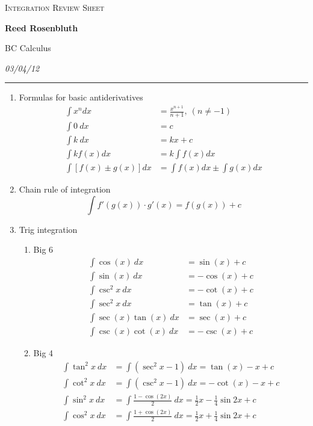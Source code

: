 \documentclass[fleqn]{article}
\begin{document}
\begin{center}
\bigskip \textsc{Integration Review Sheet}

\textbf{Reed Rosenbluth}

\textrm{BC Calculus}


\emph{03/04/12}
\end{center}

\hrule
\vspace{.2in}
\begin{enumerate}
\item Formulas for basic antiderivatives
\begin{align*}
\int {x^n } dx &= \frac{x^{n + 1} }{n + 1}, \ (n \ne  - 1)\\
\int 0 \ dx &= c\\
\int k \ dx  &= kx + c\\
\int kf(x)dx &= k \int f(x)dx\\
\int \left[ f(x) \pm g(x) \right] dx &= \int f(x)dx \pm \int g(x) dx
\end{align*}

\item Chain rule of integration
\begin{equation*}
\int {f'(g(x)) \cdot g'(x) }  = f(g(x)) + c
\end{equation*}

\item Trig integration

\begin{enumerate}
\item Big 6
\begin{align*}
\int \cos (x) \ dx &= \sin (x) + c \\[1em]
\int \sin (x) \ dx &= - \cos (x) + c \\[1em]
\int \csc^2 x \ dx &= -\cot (x) + c \\[1em]
\int \sec^2 x \ dx &= \tan (x) + c \\[1em]
\int \sec (x) \tan (x) \ dx &= \sec (x) + c \\[1em]
\int \csc (x) \cot (x) \ dx &= - \csc (x) + c 
\end{align*}

\item Big 4
\begin{align*}
\int \tan^2 x \ dx &= \int (\sec^2 x  - 1) \ dx = \tan (x) - x + c\\
\int \cot^2 x \ dx &= \int (\csc^2 x - 1) \ dx = - \cot (x) - x + c\\
\int \sin^2 x \ dx &= \int \frac{1-\cos (2x)}{2} \ dx = \frac{1}{2}x - \frac{1}{4}\sin 2x + c\\
\int \cos^2 x \ dx &= \int \frac{1+\cos (2x)}{2} \ dx = \frac{1}{2}x + \frac{1}{4}\sin 2x + c\\
\end{align*}


\end{enumerate}
\end{enumerate}
\end{document}
